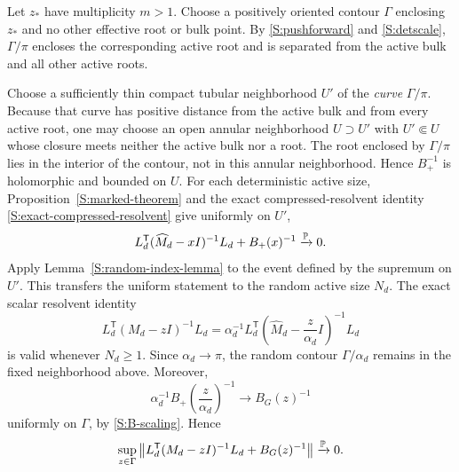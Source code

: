Let $z_*$ have multiplicity $m>1$. Choose a positively oriented contour
$\Gamma$ enclosing $z_*$ and no other effective root or bulk point. By
\eqref{S:pushforward} and \eqref{S:detscale}, $\Gamma/\pi$ encloses the
corresponding active root and is separated from the active bulk and all
other active roots.

Choose a sufficiently thin compact tubular neighborhood $U'$ of the
\emph{curve} $\Gamma/\pi$.  Because that curve has positive distance from
the active bulk and from every active root, one may choose an open annular
neighborhood $U\supset U'$ with $U'\Subset U$ whose closure meets neither
the active bulk nor a root.  The root enclosed by $\Gamma/\pi$ lies in the
interior of the contour, not in this annular neighborhood.  Hence $B_+^{-1}$
is holomorphic and bounded on $U$. For each deterministic active size,
Proposition~\ref{S:marked-theorem} and the exact compressed-resolvent
identity \eqref{S:exact-compressed-resolvent} give uniformly on $U'$,
\begin{equation}
L_d^{\mathsf T}(\widehat M_d-xI)^{-1}L_d
+B_+(x)^{-1}
\xrightarrow{\mathbb{P}}0.
\label{S:active-resolvent}
\end{equation}
Apply Lemma~\ref{S:random-index-lemma} to the event defined by the supremum
on $U'$. This transfers the uniform statement to the random active size
$N_d$. The exact scalar resolvent identity
\begin{equation}
L_d^{\mathsf T}(M_d-zI)^{-1}L_d
=
\alpha_d^{-1}
L_d^{\mathsf T}
\left(\widehat M_d-\frac z{\alpha_d}I\right)^{-1}
L_d
\label{S:resolvent-scaling}
\end{equation}
is valid whenever $N_d\ge1$. Since $\alpha_d\to\pi$, the random contour
$\Gamma/\alpha_d$ remains in the fixed neighborhood above. Moreover,
\begin{equation}
\alpha_d^{-1}B_+\!\left(\frac z{\alpha_d}\right)^{-1}
\longrightarrow
B_G(z)^{-1}
\end{equation}
uniformly on $\Gamma$, by \eqref{S:B-scaling}. Hence
\begin{equation}
\sup_{z\in\Gamma}
\left\|
L_d^{\mathsf T}(M_d-zI)^{-1}L_d+B_G(z)^{-1}
\right\|
\xrightarrow{\mathbb{P}}0.
\label{S:resolvent}
\end{equation}

